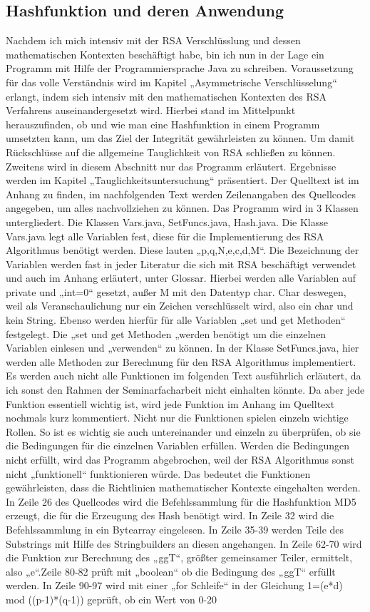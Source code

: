 \subsection{Hashfunktion und deren Anwendung}
Nachdem ich mich intensiv mit der RSA Verschlüsslung und dessen mathematischen Kontexten beschäftigt habe, bin ich nun in der Lage ein Programm mit Hilfe der Programmiersprache Java zu schreiben. Voraussetzung für das volle Verständnis wird im Kapitel „Asymmetrische Verschlüsselung“ erlangt, indem sich intensiv mit den mathematischen Kontexten des RSA Verfahrens auseinandergesetzt wird. Hierbei stand im Mittelpunkt herauszufinden, ob und wie man eine Hashfunktion in einem Programm umsetzten kann, um das Ziel der Integrität gewährleisten zu können. Um damit Rückschlüsse auf die allgemeine Tauglichkeit von RSA schließen zu können. Zweitens wird in diesem Abschnitt nur das Programm erläutert. Ergebnisse werden im Kapitel „Tauglichkeitsuntersuchung“ präsentiert. Der Quelltext ist im Anhang zu finden, im nachfolgenden Text werden Zeilenangaben des Quellcodes angegeben, um alles nachvollziehen zu können. Das Programm wird in 3 Klassen untergliedert. Die Klassen Vars.java, SetFuncs.java, Hash.java. Die Klasse Vars.java legt alle Variablen fest, diese für die Implementierung des RSA Algorithmus benötigt werden. Diese lauten „p,q,N,e,c,d,M“. Die Bezeichnung der Variablen werden fast in jeder Literatur die sich mit RSA beschäftigt verwendet und auch im Anhang erläutert, unter Glossar. Hierbei werden alle Variablen auf private und „int=0“ gesetzt, außer M mit den Datentyp char. Char deswegen, weil als Veranschaulichung nur ein Zeichen verschlüsselt wird, also ein char und kein String. Ebenso werden hierfür für alle Variablen „set und get Methoden“ festgelegt. Die „set und get Methoden „werden benötigt um die einzelnen Variablen einlesen und „verwenden“ zu können. In der Klasse SetFuncs.java, hier werden alle Methoden zur Berechnung für den RSA Algorithmus implementiert. Es werden auch nicht alle Funktionen im folgenden Text ausführlich erläutert, da ich sonst den Rahmen der Seminarfacharbeit nicht einhalten könnte. Da aber jede Funktion essentiell wichtig ist, wird jede Funktion im Anhang im Quelltext nochmals kurz kommentiert. Nicht nur die Funktionen spielen einzeln wichtige Rollen. So ist es wichtig sie auch untereinander und einzeln zu überprüfen, ob sie die Bedingungen für die einzelnen Variablen erfüllen. Werden die Bedingungen nicht erfüllt, wird das Programm abgebrochen, weil der RSA Algorithmus sonst nicht „funktionell“ funktionieren würde. Das bedeutet die Funktionen gewährleisten, dass die Richtlinien mathematischer Kontexte eingehalten werden. In Zeile 26 des Quellcodes wird die Befehlssammlung für die Hashfunktion MD5 erzeugt, die für die Erzeugung des Hash benötigt wird. In Zeile 32 wird die Befehlssammlung in ein Bytearray eingelesen. In Zeile 35-39 werden Teile des Substrings mit Hilfe des Stringbuilders an diesen angehangen. In Zeile 62-70 wird die Funktion zur Berechnung des „ggT“, größter gemeinsamer Teiler, ermittelt, also „e“.Zeile 80-82 prüft mit „boolean“ ob die Bedingung des „ggT“ erfüllt werden. In Zeile 90-97 wird mit einer „for Schleife“ in der Gleichung 1=(e*d) mod ((p-1)*(q-1)) geprüft, ob ein Wert von 0-20 